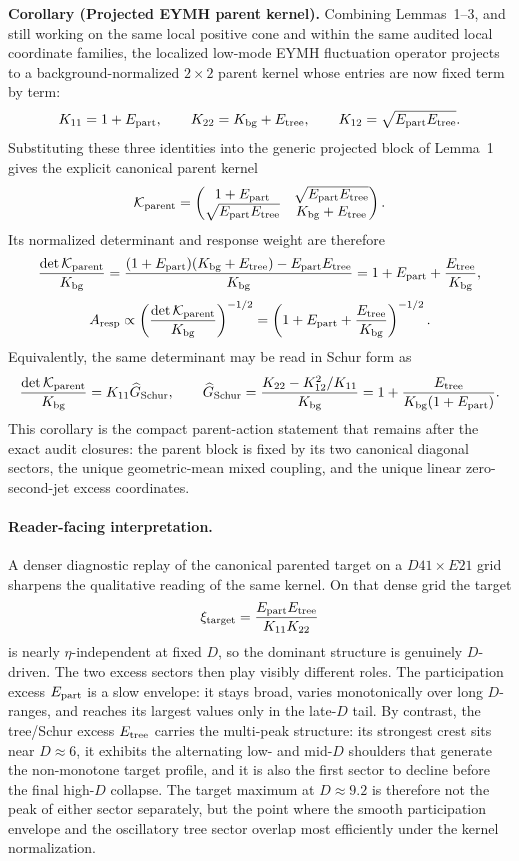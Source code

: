 \documentclass[aps,prd,onecolumn,notitlepage,nofootinbib,superscriptaddress,11pt,floatfix]{revtex4-2}
\begin{document}
\noindent\textbf{Corollary (Projected EYMH parent kernel).}
Combining Lemmas~1--3, and still working on the same local positive cone and within the same audited local coordinate families, the localized low-mode EYMH fluctuation operator projects to a background-normalized \(2\times2\) parent kernel whose entries are now fixed term by term:
\[
K_{11}=1+E_{\rm part},
\qquad
K_{22}=K_{\rm bg}+E_{\rm tree},
\qquad
K_{12}=\sqrt{E_{\rm part}E_{\rm tree}}.
\]
Substituting these three identities into the generic projected block of Lemma~1 gives the explicit canonical parent kernel
\[
\mathcal K_{\rm parent}
=
\begin{pmatrix}
1+E_{\rm part} & \sqrt{E_{\rm part}E_{\rm tree}}\\
\sqrt{E_{\rm part}E_{\rm tree}} & K_{\rm bg}+E_{\rm tree}
\end{pmatrix}.
\]
Its normalized determinant and response weight are therefore
\[
\frac{\det\mathcal K_{\rm parent}}{K_{\rm bg}}
=
\frac{(1+E_{\rm part})(K_{\rm bg}+E_{\rm tree})-E_{\rm part}E_{\rm tree}}{K_{\rm bg}}
=
1+E_{\rm part}+\frac{E_{\rm tree}}{K_{\rm bg}},
\]
\[
A_{\rm resp}
\propto
\left(\frac{\det\mathcal K_{\rm parent}}{K_{\rm bg}}\right)^{-1/2}
=
\left(1+E_{\rm part}+\frac{E_{\rm tree}}{K_{\rm bg}}\right)^{-1/2}.
\]
Equivalently, the same determinant may be read in Schur form as
\[
\frac{\det\mathcal K_{\rm parent}}{K_{\rm bg}}
=
K_{11}\widehat G_{\rm Schur},
\qquad
\widehat G_{\rm Schur}
=
\frac{K_{22}-K_{12}^2/K_{11}}{K_{\rm bg}}
=
1+\frac{E_{\rm tree}}{K_{\rm bg}(1+E_{\rm part})}.
\]
This corollary is the compact parent-action statement that remains after the exact audit closures: the parent block is fixed by its two canonical diagonal sectors, the unique geometric-mean mixed coupling, and the unique linear zero-second-jet excess coordinates.

\paragraph{Reader-facing interpretation.}
A denser diagnostic replay of the canonical parented target on a \(D41\times E21\) grid sharpens the qualitative reading of the same kernel. On that dense grid the target
\[
\xi_{\rm target}
=
\frac{E_{\rm part}E_{\rm tree}}{K_{11}K_{22}}
\]
is nearly \(\eta\)-independent at fixed \(D\), so the dominant structure is genuinely \(D\)-driven. The two excess sectors then play visibly different roles. The participation excess \(E_{\rm part}\) is a slow envelope: it stays broad, varies monotonically over long \(D\)-ranges, and reaches its largest values only in the late-\(D\) tail. By contrast, the tree/Schur excess \(E_{\rm tree}\) carries the multi-peak structure: its strongest crest sits near \(D\approx 6\), it exhibits the alternating low- and mid-\(D\) shoulders that generate the non-monotone target profile, and it is also the first sector to decline before the final high-\(D\) collapse. The target maximum at \(D\approx 9.2\) is therefore not the peak of either sector separately, but the point where the smooth participation envelope and the oscillatory tree sector overlap most efficiently under the kernel normalization.
\end{document}
